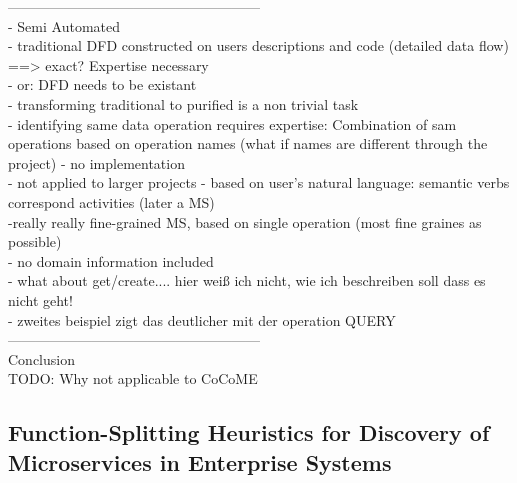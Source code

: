 ------------------------------------------------------\\
- Semi Automated \\
- traditional DFD constructed on users descriptions and code (detailed data flow) ==> exact? Expertise necessary \\
- or: DFD needs to be existant \\
- transforming traditional to purified is a non trivial task \\
- identifying same data operation requires expertise: Combination of sam operations  based on operation names (what if names are different through the project)
- no implementation \\
- not applied to larger projects
- based on user's natural language: semantic verbs correspond activities (later a MS) \\
-really really fine-grained MS, based on single operation (most fine graines as possible) \\
- no domain information included\\
- what about get/create....   hier weiß ich nicht, wie ich beschreiben soll dass es nicht geht! \\
- zweites beispiel zigt das deutlicher mit der operation QUERY \\


------------------------------------------------------\\

Conclusion \\

TODO: Why not applicable to CoCoME

\subsection{Function-Splitting Heuristics for Discovery of Microservices in Enterprise Systems}

